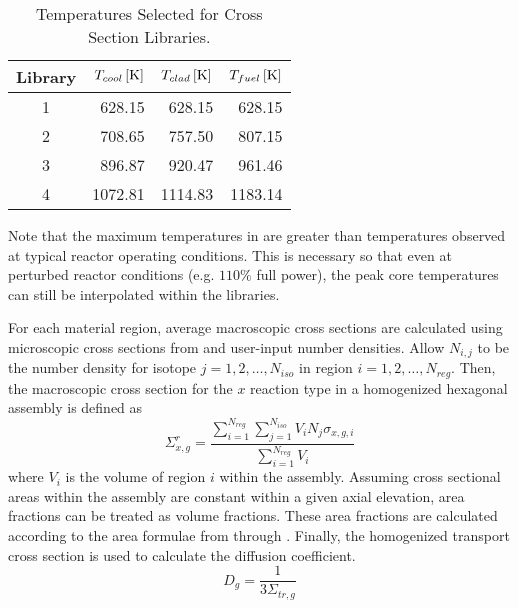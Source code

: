   \begin{table}
    \caption{Temperatures Selected for Cross Section Libraries.}
    \label{tab:xstemps}
    \begin{center}
      \begin{tabular}{crrr}
        \toprule
        Library & $T_{cool} \left[\text{{K}}\right]$ & $T_{clad} \left[\text{{K}}\right]$ & 
          $T_{fuel} \left[\text{{K}}\right]$ \\
        \midrule
        1 & 628.15 & 628.15 & 628.15  \\
        2 & 708.65 & 757.50 & 807.15  \\
        3 & 896.87 & 920.47 & 961.46 \\
        4 & 1072.81 & 1114.83 & 1183.14 \\
        \bottomrule
      \end{tabular}
    \end{center}
  \end{table}

  Note that the maximum temperatures in  are greater than 
  temperatures observed at typical reactor operating conditions. This is
  necessary so that even at perturbed reactor conditions (e.g. $110\%$ full
  power), the peak core temperatures can still be interpolated within the
  libraries.

  For each material region, average macroscopic cross
  sections are calculated using microscopic cross sections from \mcc and  
  user-input number densities. Allow $N_{i,j}$ to be the number density for
  isotope ${j=1,2,\ldots,N_{iso}}$ in region ${i=1,2,\ldots,N_{reg}}$.
  Then, the macroscopic cross section for the $x$ reaction type in a homogenized
  hexagonal assembly is defined as
  \begin{equation}
    \Sigma_{x,g}^r = \frac{\sum_{i=1}^{N_{reg}} \sum_{j=1}^{N_{iso}} V_i N_{j} 
      \sigma_{x,g,i}} {\sum_{i=1}^{N_{reg}}V_i}
  \end{equation}
  where $V_i$ is the volume of region $i$ within the assembly. Assuming cross
  sectional areas within the assembly are constant within a given axial
  elevation, area fractions can be treated as volume fractions. These area
  fractions are calculated according to the area formulae from
   through . Finally, the homogenized
  transport cross section is used to calculate the diffusion coefficient.
  \begin{equation}
    D_g = \frac{1}{3 \Sigma_{tr,g}}
  \end{equation}

